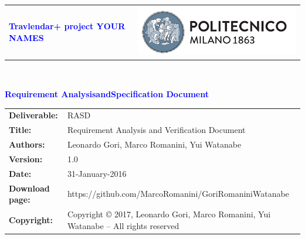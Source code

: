 




\begin{titlepage}



{\begin{table}[t!]
\centering
\begin{tabu} to \textwidth { X[1.3,r,p] X[1.7,l,p] }
\textcolor{Blue}
{\textbf{\small{Travlendar+ project YOUR NAMES}}} & \includegraphics[scale=0.5]{Images/PolimiLogo}
\end{tabu}
\end{table}}~\\ [7cm]


\begin{flushleft}

{\textcolor{Blue}{\textbf{\Huge{Requirement Analysis\newline \hfill and\newline Specification Document}}}} \\ [1cm]

\end{flushleft}

\end{titlepage}

\begin{table}[h!]
\begin{tabu} to \textwidth { X[0.3,r,p] X[0.7,l,p] }
\hline

\textbf{Deliverable:} & RASD\\
\textbf{Title:} & Requirement Analysis and Verification Document \\
\textbf{Authors:} & Leonardo Gori, Marco Romanini, Yui Watanabe \\
\textbf{Version:} & 1.0 \\ 
\textbf{Date:} & 31-January-2016 \\
\textbf{Download page:} & https://github.com/MarcoRomanini/GoriRomaniniWatanabe \\
\textbf{Copyright:} & Copyright © 2017, Leonardo Gori, Marco Romanini, Yui Watanabe – All rights reserved \\
\hline
\end{tabu}
\end{table}




